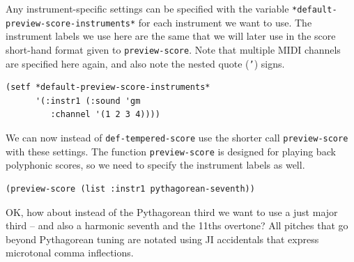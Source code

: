 \documentclass[11pt]{article}
\begin{document}
Any instrument-specific settings can be specified with the variable
\texttt{*default-preview-score-instruments*} for each instrument we want to use. The instrument labels we
use here are the same that we will later use in the score short-hand format given to
\texttt{preview-score}. Note that multiple MIDI channels are specified here again, and also note the
nested quote (\texttt{'}) signs.

\begin{verbatim}
(setf *default-preview-score-instruments*
      '(:instr1 (:sound 'gm
		 :channel '(1 2 3 4))))
\end{verbatim}

We can now instead of \texttt{def-tempered-score} use the shorter call \texttt{preview-score} with these
settings. The function \texttt{preview-score} is designed for playing back polyphonic scores, so we need
to specify the instrument labels as well.

\begin{verbatim}
(preview-score (list :instr1 pythagorean-seventh))
\end{verbatim}


OK, how about instead of the Pythagorean third we want to use a just major third -- and also a
harmonic seventh and the 11ths overtone? All pitches that go beyond Pythagorean tuning are
notated using JI accidentals that express microtonal comma inflections. 
\end{document}
